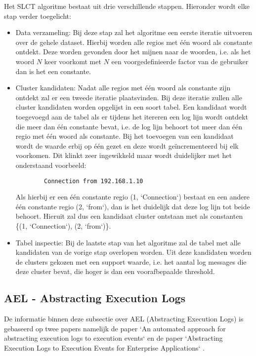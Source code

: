 Het SLCT algoritme bestaat uit drie verschillende stappen. Hieronder wordt elke stap verder toegelicht:
\begin{itemize}
    \item Data verzameling: Bij deze stap zal het algoritme een eerste iteratie uitvoeren over de gehele dataset. Hierbij worden alle regios met één woord als constante ontdekt. Deze worden gevonden door het mijnen naar de woorden, i.e. als het woord $N$ keer voorkomt met $N$ een voorgedefinieerde factor van de gebruiker dan is het een constante.\\
    \item Cluster kandidaten: Nadat alle regios met één woord als constante zijn ontdekt zal er een tweede iteratie plaatsvinden. Bij deze iteratie zullen alle cluster kandidaten worden opgelijst in een soort tabel. Een kandidaat wordt toegevoegd aan de tabel als er tijdens het itereren een log lijn wordt ontdekt die meer dan één constante bevat, i.e. de log lijn behoort tot meer dan één regio met één woord als constante. Bij het toevoegen van een kandidaat wordt de waarde erbij op één gezet en deze wordt geïncrementeerd bij elk voorkomen. Dit klinkt zeer ingewikkeld maar wordt duidelijker met het onderstaand voorbeeld:
    \begin{verbatim}
        Connection from 192.168.1.10
    \end{verbatim}
    Als hierbij er een één constante regio (1, `Connection`) bestaat en een andere één constante regio (2, `from`), dan is het duidelijk dat deze log lijn tot beide behoort. Hieruit zal dus een kandidaat cluster ontstaan met als constanten \{(1, `Connection`), (2, `from`)\}.\\
    \item Tabel inspectie: Bij de laatste stap van het algoritme zal de tabel met alle kandidaten van de vorige stap overlopen worden. Uit deze kandidaten worden de clusters gekozen met een support waarde, i.e. het aantal log messages die deze cluster bevat, die hoger is dan een voorafbepaalde threshold.
\end{itemize}

\subsection{AEL -  Abstracting Execution Logs}
De informatie binnen deze subsectie over AEL (Abstracting Execution Logs) is gebaseerd op twee papers namelijk de paper `An automated approach for abstracting execution logs to execution events` \autocite{jiang2008automated} en de paper `Abstracting Execution Logs to Execution Events for Enterprise Applications` \autocite{jiang2008abstracting}. 

